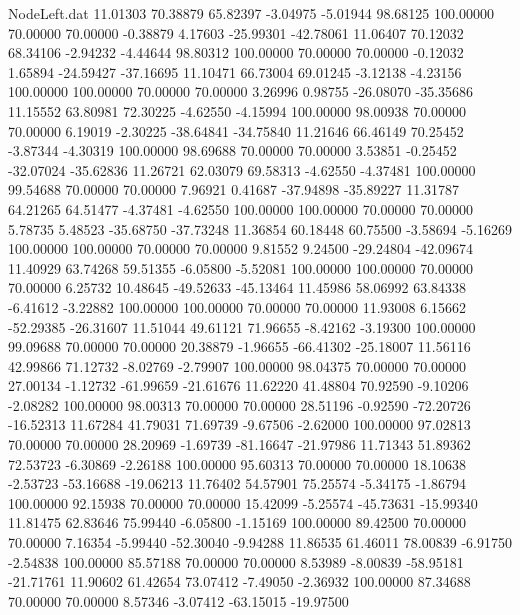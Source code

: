 \begin{filecontents}{NodeLeft.dat}
  11.01303   70.38879   65.82397    -3.04975   -5.01944   98.68125  100.00000   70.00000   70.00000   -0.38879    4.17603  -25.99301  -42.78061
  11.06407   70.12032   68.34106    -2.94232   -4.44644   98.80312  100.00000   70.00000   70.00000   -0.12032    1.65894  -24.59427  -37.16695
  11.10471   66.73004   69.01245    -3.12138   -4.23156  100.00000  100.00000   70.00000   70.00000    3.26996    0.98755  -26.08070  -35.35686
  11.15552   63.80981   72.30225    -4.62550   -4.15994  100.00000   98.00938   70.00000   70.00000    6.19019   -2.30225  -38.64841  -34.75840
  11.21646   66.46149   70.25452    -3.87344   -4.30319  100.00000   98.69688   70.00000   70.00000    3.53851   -0.25452  -32.07024  -35.62836
  11.26721   62.03079   69.58313    -4.62550   -4.37481  100.00000   99.54688   70.00000   70.00000    7.96921    0.41687  -37.94898  -35.89227
  11.31787   64.21265   64.51477    -4.37481   -4.62550  100.00000  100.00000   70.00000   70.00000    5.78735    5.48523  -35.68750  -37.73248
  11.36854   60.18448   60.75500    -3.58694   -5.16269  100.00000  100.00000   70.00000   70.00000    9.81552    9.24500  -29.24804  -42.09674
  11.40929   63.74268   59.51355    -6.05800   -5.52081  100.00000  100.00000   70.00000   70.00000    6.25732   10.48645  -49.52633  -45.13464
  11.45986   58.06992   63.84338    -6.41612   -3.22882  100.00000  100.00000   70.00000   70.00000   11.93008    6.15662  -52.29385  -26.31607
  11.51044   49.61121   71.96655    -8.42162   -3.19300  100.00000   99.09688   70.00000   70.00000   20.38879   -1.96655  -66.41302  -25.18007
  11.56116   42.99866   71.12732    -8.02769   -2.79907  100.00000   98.04375   70.00000   70.00000   27.00134   -1.12732  -61.99659  -21.61676
  11.62220   41.48804   70.92590    -9.10206   -2.08282  100.00000   98.00313   70.00000   70.00000   28.51196   -0.92590  -72.20726  -16.52313
  11.67284   41.79031   71.69739    -9.67506   -2.62000  100.00000   97.02813   70.00000   70.00000   28.20969   -1.69739  -81.16647  -21.97986
  11.71343   51.89362   72.53723    -6.30869   -2.26188  100.00000   95.60313   70.00000   70.00000   18.10638   -2.53723  -53.16688  -19.06213
  11.76402   54.57901   75.25574    -5.34175   -1.86794  100.00000   92.15938   70.00000   70.00000   15.42099   -5.25574  -45.73631  -15.99340
  11.81475   62.83646   75.99440    -6.05800   -1.15169  100.00000   89.42500   70.00000   70.00000    7.16354   -5.99440  -52.30040   -9.94288
  11.86535   61.46011   78.00839    -6.91750   -2.54838  100.00000   85.57188   70.00000   70.00000    8.53989   -8.00839  -58.95181  -21.71761
  11.90602   61.42654   73.07412    -7.49050   -2.36932  100.00000   87.34688   70.00000   70.00000    8.57346   -3.07412  -63.15015  -19.97500

\end{filecontents}
